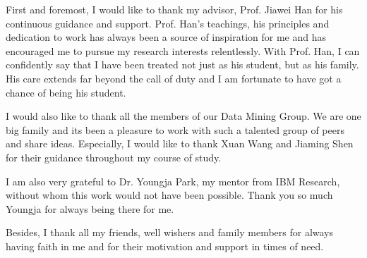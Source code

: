 First and foremost, I would like to thank my advisor, Prof. Jiawei Han for his continuous guidance and support. Prof. Han's teachings, his principles and dedication to work has always been a source of inspiration for me and has encouraged me to pursue my research interests relentlessly. With Prof. Han, I can confidently say that I have been treated not just as his student, but as his family. His care extends far beyond the call of duty and I am fortunate to have got a chance of being his student.

I would also like to thank all the members of our Data Mining Group. We are one big family and its been a pleasure to work with such a talented group of peers and share ideas. Especially, I would like to thank Xuan Wang and Jiaming Shen for their guidance throughout my course of study.

I am also very grateful to Dr. Youngja Park, my mentor from IBM Research, without whom this work would not have been possible. Thank you so much Youngja for always being there for me.

Besides, I thank all my friends, well wishers and family members for always having faith in me and for their motivation and support in times of need.